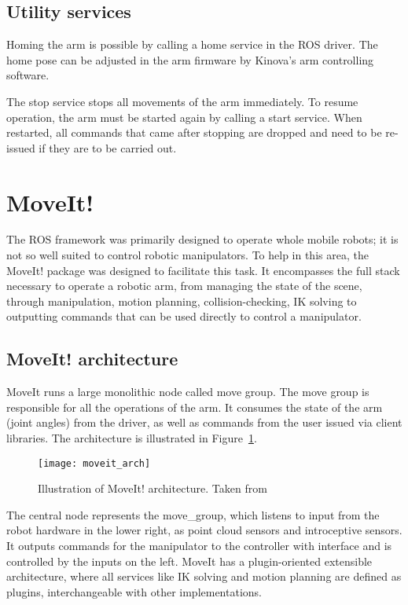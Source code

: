 \documentclass[buriama8_dp.tex]{subfiles}
\begin{document}
\subsection{Utility services}
\label{subsec:api_util}

Homing the arm is possible by calling a home service in the ROS driver. The home pose can be adjusted in the arm firmware by Kinova's arm controlling software.

The stop service stops all movements of the arm immediately. To resume operation, the arm must be started again by calling a start service. When restarted, all commands that came after stopping are dropped and need to be re-issued if they are to be carried out.

\section{MoveIt!}
\label{sec:moveit}

The ROS framework was primarily designed to operate whole mobile robots; it is not so well suited to control robotic manipulators. To help in this area, the MoveIt! package \cite{moveit_docs} was designed to facilitate this task. It encompasses the full stack necessary to operate a robotic arm, from managing the state of the scene, through manipulation, motion planning, collision-checking, IK solving to outputting commands that can be used directly to control a manipulator.

\subsection{MoveIt! architecture}
\label{subsec:mvt_arch}

MoveIt runs a large monolithic node called move group. The move group is responsible for all the operations of the arm. It consumes the state of the arm (joint angles) from the driver, as well as commands from the user issued via client libraries. The architecture is illustrated in Figure~\ref{fig:moveit_arch}.

\begin{figure}[ht]
  \centering
  \texttt{[image: moveit\_arch]}
  \caption[MoveIt! architecture]{Illustration of MoveIt! architecture. Taken from \cite{moveit_docs}}
  \label{fig:moveit_arch}
\end{figure}

The central node represents the move\_group, which listens to input from the robot hardware in the lower right, as point cloud sensors and introceptive sensors. It outputs commands for the manipulator to the controller with  interface and is controlled by the inputs on the left. MoveIt has a plugin-oriented extensible architecture, where all services like IK solving and motion planning are defined as plugins, interchangeable with other implementations.
\end{document}
